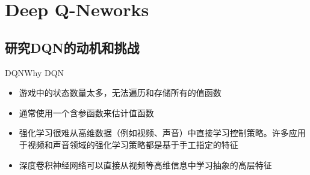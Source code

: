 \documentclass[10pt]{beamer}
\begin{document}
%			
%			
%			
%			
%
	
	\section{Deep Q-Neworks}
	
	\subsection{研究DQN的动机和挑战}
	
	\begin{frame}{DQN}{Why DQN}
		\begin{itemize}
			\item<2-> 游戏中的状态数量太多，无法遍历和存储所有的值函数
			
			\item<3-> 通常使用一个含参函数来估计值函数
			
			\item<4-> 强化学习很难从高维数据（例如视频、声音）中直接学习控制策略。许多应用于视频和声音领域的强化学习策略都是基于手工指定的特征
			
			\item<5-> 深度卷积神经网络可以直接从视频等高维信息中学习抽象的高层特征
		\end{itemize}
	\end{frame}
\end{document}
